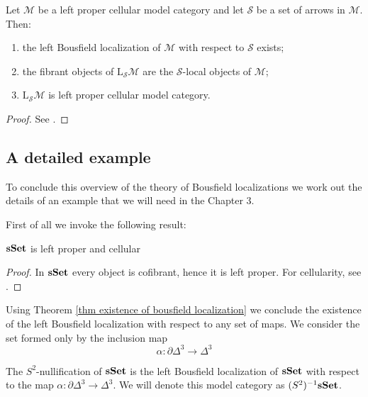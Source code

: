 \begin{thm} \label{thm existence of bousfield localization}
Let $\mathcal M$ be a left proper cellular model category and let $\mathcal S$ be a set of arrows in $\mathcal M$. Then:
\begin{enumerate}
\item the left Bousfield localization of $\mathcal M$ with respect to $\mathcal S$ exists;
\item the fibrant objects of $\mathrm L_{\mathcal S} \mathcal M$ are the $\mathcal S$-local objects of $\mathcal M$;
\item $\mathrm L_{\mathcal S} \mathcal M$ is left proper cellular model category.
\end{enumerate}
\end{thm}

\begin{proof}
See \cite[Theorem 4.1.1]{hirschhorn}.
\end{proof}

\subsection{A detailed example}

To conclude this overview of the theory of Bousfield localizations we work out the details of an example that we will need in the Chapter 3.

First of all we invoke the following result:

\begin{thm}
$\mathbf{sSet}$ is left proper and cellular
\end{thm}

\begin{proof}
In $\mathbf{sSet}$ every object is cofibrant, hence it is left proper. For cellularity, see \cite[Proposition 12.1.4]{hirschhorn}.
\end{proof}

Using Theorem \ref{thm existence of bousfield localization} we conclude the existence of the left Bousfield localization with respect to any set of maps. We consider the set formed only by the inclusion map
\[
\alpha \colon \partial \Delta^3 \to \Delta^3
\]

\begin{defin}
The $S^2$-nullification of $\mathbf{sSet}$ is the left Bousfield localization of $\mathbf{sSet}$ with respect to the map $\alpha \colon \partial \Delta^3 \to \Delta^3$. We will denote this model category as $(S^2)^{-1} \mathbf{sSet}$.
\end{defin}

